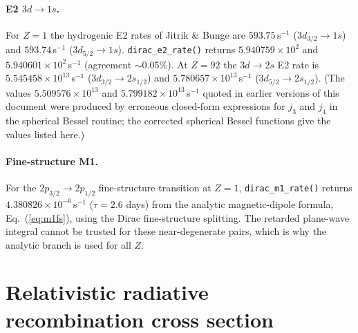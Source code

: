 \documentclass[11pt,a4paper]{article}
\begin{document}
\paragraph{E2 $3d\to1s$.}
For $Z=1$ the hydrogenic E2 rates of Jitrik \& Bunge
\cite{JitrikBunge2004} are $593.75$\,s${}^{-1}$ ($3d_{3/2}\to1s$) and
$593.74$\,s${}^{-1}$ ($3d_{5/2}\to1s$).  {\tt dirac\_e2\_rate()}
returns $5.940759\times10^{2}$ and $5.940601\times10^{2}$\,s${}^{-1}$
(agreement $\sim0.05\%$).   At $Z=92$ the $3d\to2s$ E2 rate is
$5.545458\times10^{13}$\,s${}^{-1}$ ($3d_{3/2}\to2s_{1/2}$) and
$5.780657\times10^{13}$\,s${}^{-1}$ ($3d_{5/2}\to2s_{1/2}$).
(The values $5.509576\times10^{13}$ and $5.799182\times10^{13}$\,s${}^{-1}$
quoted in earlier versions of this document were produced by erroneous
closed-form expressions for $j_{3}$ and $j_{4}$ in the spherical Bessel
routine; the corrected spherical Bessel functions give the values listed
here.)

\paragraph{Fine-structure M1.}
For the $2p_{3/2}\to2p_{1/2}$ fine-structure transition at $Z=1$,
{\tt dirac\_m1\_rate()} returns $4.380826\times10^{-6}$\,s${}^{-1}$
($\tau = 2.6$ days) from the analytic magnetic-dipole formula,
Eq.~(\ref{eq:m1fs}), using the Dirac fine-structure splitting.  The
retarded plane-wave integral cannot be trusted for these near-degenerate
pairs, which is why the analytic branch is used for all $Z$.

\section{Relativistic radiative recombination cross section}
\label{sec:rrxsec}
\end{document}
